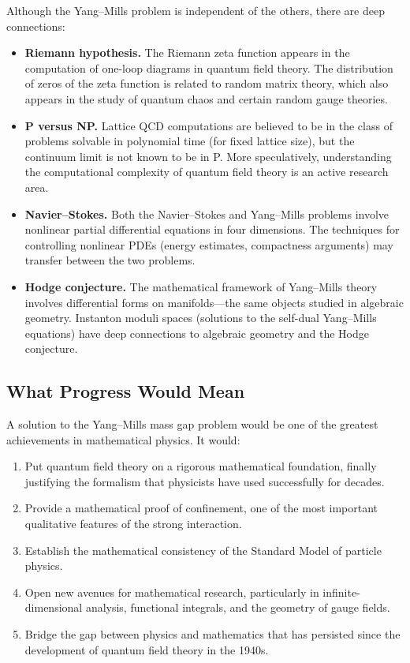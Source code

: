 Although the Yang--Mills problem is independent of the others, there are deep connections:

\begin{itemize}
  \item \textbf{Riemann hypothesis.} The Riemann zeta function appears in the computation of one-loop diagrams in quantum field theory. The distribution of zeros of the zeta function is related to random matrix theory, which also appears in the study of quantum chaos and certain random gauge theories.

  \item \textbf{P versus NP.} Lattice QCD computations are believed to be in the class of problems solvable in polynomial time (for fixed lattice size), but the continuum limit is not known to be in P. More speculatively, understanding the computational complexity of quantum field theory is an active research area.

  \item \textbf{Navier--Stokes.} Both the Navier--Stokes and Yang--Mills problems involve nonlinear partial differential equations in four dimensions. The techniques for controlling nonlinear PDEs (energy estimates, compactness arguments) may transfer between the two problems.

  \item \textbf{Hodge conjecture.} The mathematical framework of Yang--Mills theory involves differential forms on manifolds---the same objects studied in algebraic geometry. Instanton moduli spaces (solutions to the self-dual Yang--Mills equations) have deep connections to algebraic geometry and the Hodge conjecture.
\end{itemize}

\subsection{What Progress Would Mean}

A solution to the Yang--Mills mass gap problem would be one of the greatest achievements in mathematical physics. It would:

\begin{enumerate}
  \item Put quantum field theory on a rigorous mathematical foundation, finally justifying the formalism that physicists have used successfully for decades.
  \item Provide a mathematical proof of confinement, one of the most important qualitative features of the strong interaction.
  \item Establish the mathematical consistency of the Standard Model of particle physics.
  \item Open new avenues for mathematical research, particularly in infinite-dimensional analysis, functional integrals, and the geometry of gauge fields.
  \item Bridge the gap between physics and mathematics that has persisted since the development of quantum field theory in the 1940s.
\end{enumerate}

